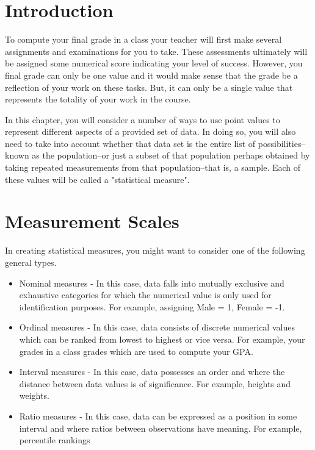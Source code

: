 \documentclass[10pt,]{book}
\theoremstyle{plain}
\theoremstyle{definition}
\theoremstyle{definition}
\theoremstyle{definition}
\numberwithin{equation}{section}
\begin{document}
\section[{Introduction}]{Introduction}\label{section-1}

To compute your final grade in a class your teacher will first make several assignments and examinations for you to take. These assessments ultimately will be assigned some numerical score indicating your level of success. However, you final grade can only be one value and it would make sense that the grade be a reflection of your work on these tasks. But, it can only be a single value that represents the totality of your work in the course. 
%
\par

In this chapter, you will consider a number of ways to use point values to represent different aspects of a provided set of data. In doing so, you will also need to take into account whether that data set is the entire list of possibilities--known as the population--or just a subset of that population perhaps obtained by taking repeated measurements from that population--that is, a sample. Each of these values will be called a "statistical measure".
%
\typeout{************************************************}
\typeout{************************************************}
\section[{Measurement Scales}]{Measurement Scales}\label{section-2}
In creating statistical measures, you might want to consider one of the following general types.
	\leavevmode%
\begin{itemize}[label=\textbullet]
\item{}Nominal measures - In this case, data falls into mutually exclusive and exhaustive categories for which the numerical value is only used for identification purposes. For example, assigning Male = 1, Female = -1.%
\item{}Ordinal measures - In this case, data consists of discrete numerical values which can be ranked from lowest to highest or vice versa. For example, your grades in a class grades which are used to compute your GPA.%
\item{}Interval measures - In this case, data possesses an order and where the distance between data values is of significance. For example, heights and weights.%
\item{}Ratio measures - In this case, data can be expressed as a position in some interval and where ratios between observations have meaning. For example, percentile rankings%
\end{itemize}
\end{document}

